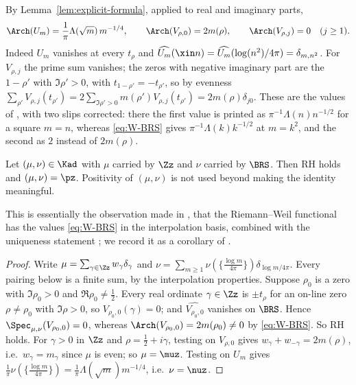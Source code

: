 By Lemma~\ref{lem:explicit-formula}, applied to real and imaginary parts,
\begin{equation}\label{eq:W-BRS}
\Arch(U_m)=\frac1\pi\Lambda(\sqrt m)\,m^{-1/4},\qquad \Arch(V_{\rho,0})=2m(\rho),\qquad \Arch(V_{\rho,j})=0\quad(j\ge1).
\end{equation}
Indeed $U_m$ vanishes at every $t_\rho$ and $\widehat{U_m}(\xin n)=\widehat{U_m}(\log(n^2)/4\pi)=\delta_{m,n^2}$. For $V_{\rho,j}$ the
prime sum vanishes; the zeros with negative imaginary part are the $1-\rho'$ with $\Im\rho'>0$, with $t_{1-\rho'}=-t_{\rho'}$, so
by evenness $\sum_{\rho'}V_{\rho,j}(t_{\rho'})=2\sum_{\Im\rho'>0}m(\rho')V_{\rho,j}(t_{\rho'})=2m(\rho)\delta_{j0}$. These are the values
of \cite[\S4.4]{BRS}, with two slips corrected: there the first value is printed as $\pi^{-1}\Lambda(n)n^{-1/2}$ for a square $m=n$,
whereas \eqref{eq:W-BRS} gives $\pi^{-1}\Lambda(k)k^{-1/2}$ at $m=k^2$, and the second as $2$ instead of $2m(\rho)$.

\begin{proposition}\label{thm:support}
Let $(\mu,\nu)\in\Kad$ with $\mu$ carried by $\Zz$ and $\nu$ carried by $\BRS$. Then RH holds and $(\mu,\nu)=\pz$. Positivity of
$(\mu,\nu)$ is not used beyond making the identity meaningful.
\end{proposition}

This is essentially the observation made in \cite[\S4.4]{BRS}, that the Riemann--Weil functional has the values
\eqref{eq:W-BRS} in the interpolation basis, combined with the uniqueness statement \cite[Corollary~1.1]{BRS}; we record it as a
corollary of \cite[Theorem~1.1]{BRS}.

\begin{proof}
Write $\mu=\sum_{\gamma\in\Zz}w_\gamma\delta_\gamma$ and $\nu=\sum_{m\ge1}\nu(\{\frac{\log m}{4\pi}\})\delta_{\log m/4\pi}$. Every pairing
below is a finite sum, by the interpolation properties. Suppose $\rho_0$ is a zero with $\Im\rho_0>0$ and $\Re\rho_0\ne\frac12$.
Every real ordinate $\gamma\in\Zz$ is $\pm t_\rho$ for an on-line zero $\rho\ne\rho_0$ with $\Im\rho>0$, so $V_{\rho_0,0}(\gamma)=0$;
and $\widehat{V_{\rho_0,0}}$ vanishes on $\BRS$. Hence $\Spec_{\mu,\nu}(V_{\rho_0,0})=0$, whereas $\Arch(V_{\rho_0,0})=2m(\rho_0)\ne0$ by
\eqref{eq:W-BRS}. So RH holds. For $\gamma>0$ in $\Zz$ and $\rho=\frac12+i\gamma$, testing on $V_{\rho,0}$ gives
$w_\gamma+w_{-\gamma}=2m(\rho)$, i.e.\ $w_\gamma=m_\gamma$ since $\mu$ is even; so $\mu=\muz$. Testing on $U_m$ gives
$\frac1\pi\nu(\{\frac{\log m}{4\pi}\})=\frac1\pi\Lambda(\sqrt m)m^{-1/4}$, i.e.\ $\nu=\nuz$.
\end{proof}

